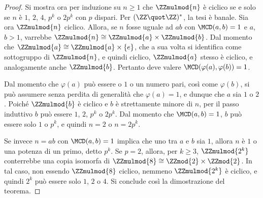 \documentclass[12pt]{scrartcl}
\begin{document}
\begin{proof}
		
		Si mostra ora per induzione su $n \geq 1$ che $\ZZmulmod{n}$ è ciclico
		se e solo se $n$ è $1$, $2$,
		$4$, $p^k$ o $2p^k$ con $p$ dispari. Per $(\ZZ \quot \ZZ)^*$,
		la tesi è banale. 
		Sia ora $\ZZmulmod{n}$
		ciclico. Allora, se $n$ fosse uguale ad $ab$ con
		$\MCD(a, b) = 1$ e $a$, $b > 1$, varrebbe $\ZZmulmod{n} \cong
		\ZZmulmod{a} \times \ZZmulmod{b}$. Dal momento che
		$\ZZmulmod{a} \cong \ZZmulmod{a} \times \{e\}$,
		che a sua volta si identifica come sottogruppo di
		$\ZZmulmod{n}$, e quindi ciclico, $\ZZmulmod{a}$ stesso
		è ciclico, e analogamente anche $\ZZmulmod{b}$. Pertanto
		deve valere $\MCD(\varphi(a), \varphi(b)) = 1$. \medskip
		
		
		Dal momento che $\varphi(a)$ può essere o $1$ o un
		numero pari, così come $\varphi(b)$, si può assumere
		senza perdita di generalità che $\varphi(a) = 1$,
		e dunque che $a$ sia $1$ o $2$. Poiché $\ZZmulmod{b}$
		è ciclico e $b$ è strettamente minore di
		$n$, per il passo induttivo $b$ può essere
		$1$, $2$, $p^k$ o $2p^k$. Dal momento che $\MCD(a, b) = 1$,
		$b$ può essere solo $1$ o $p^k$, e quindi $n = 2$ o
		$n = 2 p^k$. \medskip
		
		
		Se invece $n = ab$ con $\MCD(a, b) = 1$ implica che
		uno tra $a$ e $b$ sia $1$, allora $n$ è $1$ o una
		potenza di un primo, detto $p^k$. Se $p = 2$,
		allora, per $k \geq 3$, $\ZZmulmod{2^k}$
		conterrebbe una copia isomorfa di $\ZZmulmod{8} \cong
		\ZZmod{2} \times \ZZmod{2}$. In tal caso,
		non essendo $\ZZmulmod{8}$ ciclico, nemmeno $\ZZmulmod{2^k}$
		è ciclico, e quindi $2^k$ può essere solo $1$, $2$ o
		$4$. Si conclude così la dimostrazione del teorema.
	\end{proof}
\end{document}
